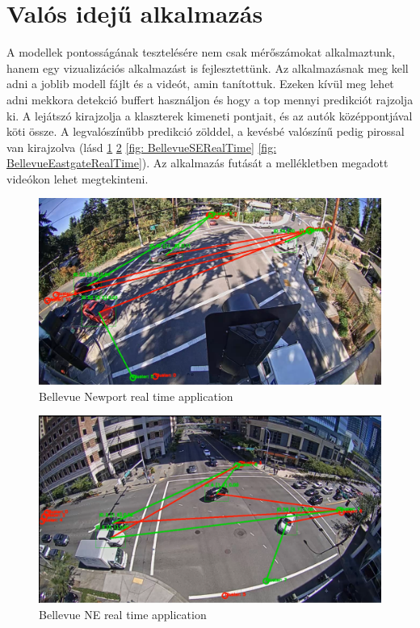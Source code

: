 \documentclass[acmtog, authorversion]{acmart}
\begin{document}
\section{Valós idejű alkalmazás}
A modellek pontosságának tesztelésére nem csak mérőszámokat alkalmaztunk, hanem egy vizualizációs alkalmazást is fejlesztettünk. Az alkalmazásnak meg kell adni
a joblib modell fájlt és a videót, amin tanítottuk. Ezeken kívül meg lehet adni mekkora detekció buffert használjon és hogy a top mennyi predikciót rajzolja ki.
A lejátszó kirajzolja a klaszterek kimeneti pontjait, és az autók középpontjával köti össze. A legvalószínűbb predikció zölddel, a kevésbé valószínű pedig pirossal
van kirajzolva (lásd \ref{BellevueNewportRealTime} \ref{fig: BellevueNERealTime} \ref{fig: BellevueSERealTime} \ref{fig: BellevueEastgateRealTime}). 
Az alkalmazás futását a mellékletben megadott videókon lehet megtekinteni.

\begin{figure}[H]
    \includegraphics[width=1\columnwidth]{visualization/bellevue_newport.png}
    \caption{Bellevue Newport real time application}
    \label{BellevueNewportRealTime}
\end{figure}

\begin{figure}[H]
    \includegraphics[width=1\columnwidth]{visualization/bellevue_ne.png}
    \caption{Bellevue NE real time application}
    \label{fig: BellevueNERealTime}
\end{figure}
\end{document}
